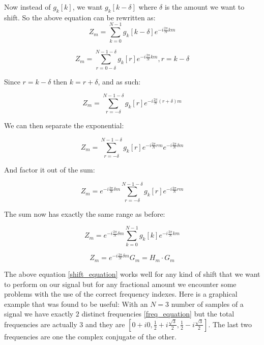 \documentclass[]{usiinfbachelorproject}
\begin{document}
	Now instead of $g_k[k]$, we want $g_k[k - \delta]$ where $\delta$ is the amount we want to shift.
	So the above equation can be rewritten as:
	\begin{equation*}
		Z_m = \displaystyle\sum_{k=0}^{N-1}g_k[k - \delta]e^{-i \frac{2\pi}{N} km}
	\end{equation*}
	
	\begin{equation*}
		Z_m = \displaystyle\sum_{r = 0 - \delta}^{N-1-\delta}g_k[r]e^{-i \frac{2\pi}{N} km}, r = k - \delta 
	\end{equation*}
	
	Since $r = k - \delta$ then $ k = r + \delta$, and as such:
	
	\begin{equation*}
		Z_m = \displaystyle\sum_{r= -\delta}^{N-1 - \delta}g_k[r]e^{-i \frac{2\pi}{N} (r + \delta)m}
	\end{equation*}
	
	We can then separate the exponential:
	
	\begin{equation*}
		Z_m = \displaystyle\sum_{r= -\delta}^{N-1 - \delta}g_k[r]e^{-i \frac{2\pi}{N} rm}e^{-i \frac{2\pi}{N}  \delta m}
	\end{equation*}
	
	And factor it out of the sum:
	
	\begin{equation*}
		Z_m = e^{-i \frac{2\pi}{N}  \delta m} \displaystyle\sum_{r= -\delta}^{N-1 - \delta}g_k[r]e^{-i \frac{2\pi}{N} rm}
	\end{equation*}
	
	The sum now has exactly the same range as before:
	
	\begin{equation*}
		Z_m = e^{-i \frac{2\pi}{N}  \delta m} \displaystyle\sum_{k=0}^{N-1}g_k[k]e^{-i \frac{2\pi}{N} km}
	\end{equation*}
	
	\begin{equation}
		Z_m = e^{-i \frac{2\pi}{N}  \delta m} G_m = H_m \cdot G_m \label{shift_equation}
	\end{equation}
	
	
	The above equation \ref{shift_equation} works well for any kind of shift that we want to perform on our signal but for any fractional amount we encounter some problems with the use of the correct frequency indexes.
	Here is a graphical example that was found to be useful: With an $N=3$ number of samples of a signal we have exactly $2$ distinct frequencies \ref{freq_equation} but the total frequencies are actually $3$ and they are $[0+i0, \frac{1}{2}+i\frac{\sqrt{3}}{2}, \frac{1}{2}-i\frac{\sqrt{3}}{2}]$. The last two frequencies are one the complex conjugate of the other.
	
\end{document}
